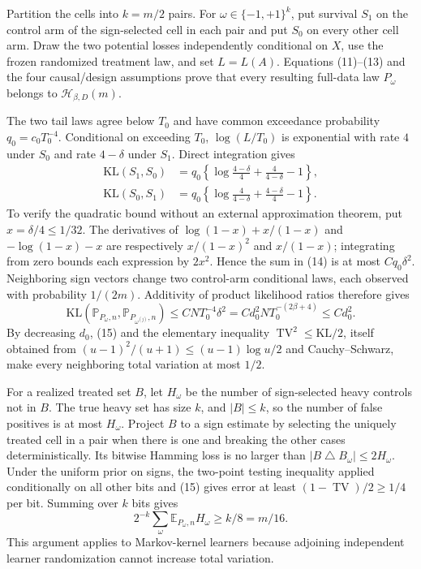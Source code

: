 Partition the cells into \(k=m/2\) pairs.  For \(\omega\in\{-1,+1\}^k\), put survival \(S_1\) on the control arm of the sign-selected cell in each pair and put \(S_0\) on every other cell arm.  Draw the two potential losses independently conditional on \(X\), use the frozen randomized treatment law, and set \(L=L(A)\).  Equations (11)--(13) and the four causal/design assumptions prove that every resulting full-data law \(P_\omega\) belongs to \(\mathcal H_{\beta,D}(m)\).

The two tail laws agree below \(T_0\) and have common exceedance probability \(q_0=c_0T_0^{-4}\).  Conditional on exceeding \(T_0\), \(\log(L/T_0)\) is exponential with rate \(4\) under \(S_0\) and rate \(4-\delta\) under \(S_1\).  Direct integration gives
\[
\begin{split}
\mathrm{KL}(S_1,S_0)&=q_0\left\{\log\frac{4-\delta}{4}+\frac4{4-\delta}-1\right\},\\
\mathrm{KL}(S_0,S_1)&=q_0\left\{\log\frac4{4-\delta}+\frac{4-\delta}{4}-1\right\}.
\end{split}                                                              \tag{14}
\]
To verify the quadratic bound without an external approximation theorem, put \(x=\delta/4\leq1/32\).  The derivatives of \(\log(1-x)+x/(1-x)\) and \(-\log(1-x)-x\) are respectively \(x/(1-x)^2\) and \(x/(1-x)\); integrating from zero bounds each expression by \(2x^2\).  Hence the sum in (14) is at most \(Cq_0\delta^2\).  Neighboring sign vectors change two control-arm conditional laws, each observed with probability \(1/(2m)\).  Additivity of product likelihood ratios therefore gives
\[
\mathrm{KL}(\mathbb P_{P_\omega,n},\mathbb P_{P_{\omega^{(j)}},n})
\leq C N T_0^{-4}\delta^2
=C d_0^2 N T_0^{-(2\beta+4)}
\leq C d_0^2.                                                            \tag{15}
\]
By decreasing \(d_0\), (15) and the elementary inequality \(\operatorname{TV}^2\leq\mathrm{KL}/2\), itself obtained from \((u-1)^2/(u+1)\leq(u-1)\log u/2\) and Cauchy--Schwarz, make every neighboring total variation at most \(1/2\).

For a realized treated set \(B\), let \(H_\omega\) be the number of sign-selected heavy controls not in \(B\).  The true heavy set has size \(k\), and \(|B|\leq k\), so the number of false positives is at most \(H_\omega\).  Project \(B\) to a sign estimate by selecting the uniquely treated cell in a pair when there is one and breaking the other cases deterministically.  Its bitwise Hamming loss is no larger than \(|B\mathbin\triangle B_\omega|\leq2H_\omega\).  Under the uniform prior on signs, the two-point testing inequality applied conditionally on all other bits and (15) gives error at least \((1-\operatorname{TV})/2\geq1/4\) per bit.  Summing over \(k\) bits gives
\[
2^{-k}\sum_\omega\mathbb E_{P_\omega,n}H_\omega\geq k/8=m/16.         \tag{16}
\]
This argument applies to Markov-kernel learners because adjoining independent learner randomization cannot increase total variation.

